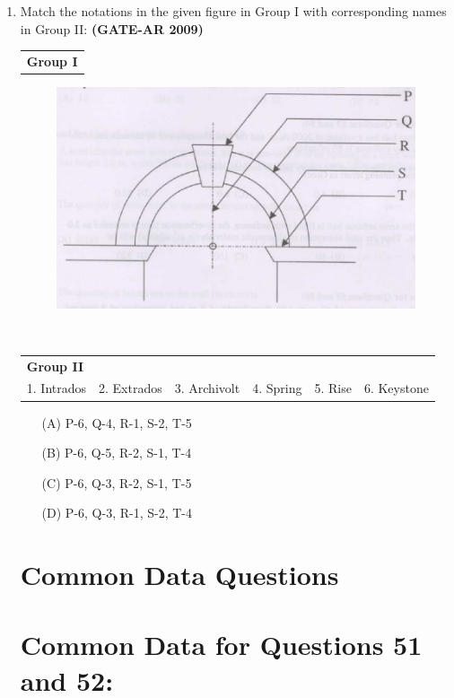 \documentclass[a4paper,10pt]{article}
\begin{document}
\begin{enumerate}
	\item Match the notations in the given figure in Group I with corresponding names in Group II: \hfill \textbf{(GATE-AR 2009)} \\
    \begin{tabular}{ p{\dimexpr\columnwidth-2\tabcolsep} }
	\textbf{Group I} \\
	\end{tabular}
	\begin{figure}[h!]
        \centering
        \includegraphics[width=0.5\linewidth]{figs/img_04.jpg}
        \label{fig:Img04}
	\end{figure} \\
	\begin{tabular}{ p{\dimexpr\columnwidth-2\tabcolsep} p{\dimexpr\columnwidth-2\tabcolsep} p{\dimexpr\columnwidth-2\tabcolsep} p{\dimexpr\columnwidth-2\tabcolsep} p{\dimexpr\columnwidth-2\tabcolsep} p{\dimexpr\columnwidth-2\tabcolsep} }
	\textbf{Group II} & & & & & \\
	1. Intrados & 2. Extrados & 3. Archivolt & 4. Spring & 5. Rise & 6. Keystone \\
	\end{tabular}	
	\begin{itemize}
        \item[(A)] P-6, Q-4, R-1, S-2, T-5
        \item[(B)] P-6, Q-5, R-2, S-1, T-4
        \item[(C)] P-6, Q-3, R-2, S-1, T-5
        \item[(D)] P-6, Q-3, R-1, S-2, T-4
    \end{itemize}

\section*{Common Data Questions}
\section*{Common Data for Questions 51 and 52:}

\end{enumerate}
\end{document}
